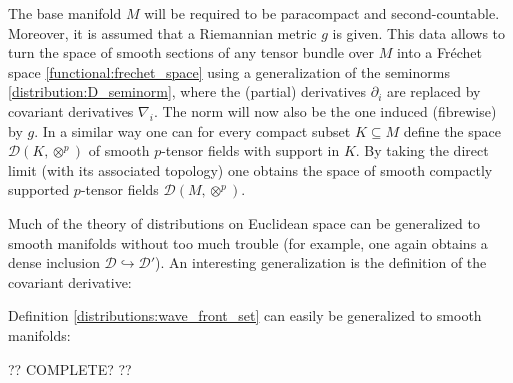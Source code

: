     The base manifold $M$ will be required to be paracompact and second-countable. Moreover, it is assumed that a Riemannian metric $g$ is given. This data allows to turn the space of smooth sections of any tensor bundle over $M$ into a Fr\'echet space \ref{functional:frechet_space} using a generalization of the seminorms \eqref{distribution:D_seminorm}, where the (partial) derivatives $\partial_i$ are replaced by covariant derivatives $\nabla_i$. The norm will now also be the one induced (fibrewise) by $g$. In a similar way one can for every compact subset $K\subseteq M$ define the space $\mathcal{D}(K,\otimes^p)$ of smooth $p$-tensor fields with support in $K$. By taking the direct limit (with its associated topology) one obtains the space of smooth compactly supported $p$-tensor fields $\mathcal{D}(M,\otimes^p)$.


    Much of the theory of distributions on Euclidean space can be generalized to smooth manifolds without too much trouble (for example, one again obtains a dense inclusion $\mathcal{D}\hookrightarrow\mathcal{D}'$). An interesting generalization is the definition of the covariant derivative:

    Definition \ref{distributions:wave_front_set} can easily be generalized to smooth manifolds:

    ?? COMPLETE? ??